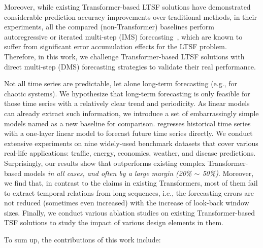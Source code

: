 Moreover, while existing Transformer-based LTSF solutions have demonstrated considerable prediction accuracy improvements over traditional methods, 
%
in their experiments, all the compared (non-Transformer) baselines perform autoregressive or iterated multi-step (IMS) forecasting~\cite{ariyo2014arima,DavidSalinas2017DeepARPF,DzmitryBahdanau2014NeuralMT,SeanJTaylor2017ForecastingAS}, which are known to suffer from significant error accumulation effects for the LTSF problem. Therefore, in this work, we challenge Transformer-based LTSF solutions with direct multi-step (DMS) forecasting strategies to validate their real performance.  

Not all time series are predictable, let alone long-term forecasting (e.g., for chaotic systems). We hypothesize that long-term forecasting is only feasible for those time series with a relatively clear trend and periodicity. As linear models can already extract such information, we introduce a set of embarrassingly simple models named \textbf{\modelname} as a new baseline for comparison. 
\modelname regresses historical time series with a one-layer linear model to forecast future time series directly. We conduct extensive experiments on nine widely-used benchmark datasets that cover various real-life applications: traffic, energy, economics, weather, and disease predictions.
Surprisingly, our results show that \modelname outperforms existing complex Transformer-based models \emph{in all cases, and often by a large margin (20\% $\sim$ 50\%)}. 
Moreover, we find that, in contrast to the claims in existing Transformers, most of them fail to extract temporal relations from long sequences, i.e., the forecasting errors are not reduced (sometimes even increased) with the increase of look-back window sizes. Finally, we conduct various ablation studies on existing Transformer-based TSF solutions to study the impact of various design elements in them. 

To sum up, the contributions of this work include:

